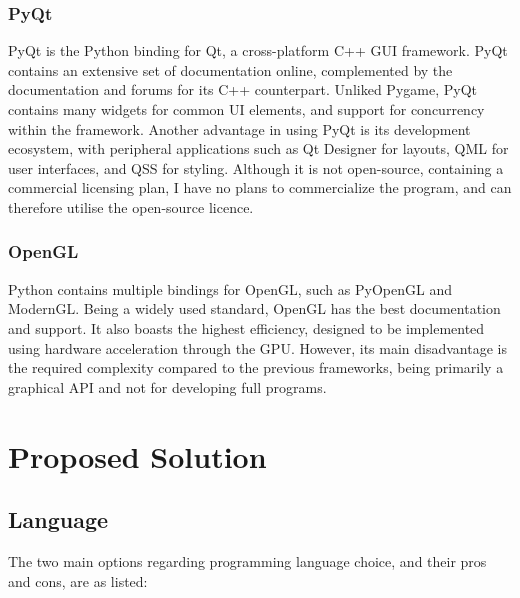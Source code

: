 \documentclass[../main/main.tex]{subfiles}
\begin{document}
\subsubsection*{PyQt}
PyQt is the Python binding for Qt, a cross-platform C++ GUI framework. PyQt contains an extensive set of documentation online, complemented by the documentation and forums for its C++ counterpart. Unliked Pygame, PyQt contains many widgets for common UI elements, and support for concurrency within the framework. Another advantage in using PyQt is its development ecosystem, with peripheral applications such as Qt Designer for layouts, QML for user interfaces, and QSS for styling. Although it is not open-source, containing a commercial licensing plan, I have no plans to commercialize the program, and can therefore utilise the open-source licence.

\subsubsection*{OpenGL}
Python contains multiple bindings for OpenGL, such as PyOpenGL and ModernGL. Being a widely used standard, OpenGL has the best documentation and support. It also boasts the highest efficiency, designed to be implemented using hardware acceleration through the GPU. However, its main disadvantage is the required complexity compared to the previous frameworks, being primarily a graphical API and not for developing full programs.

\section{Proposed Solution}
\subsection{Language}
The two main options regarding programming language choice, and their pros and cons, are as listed:
\end{document}
